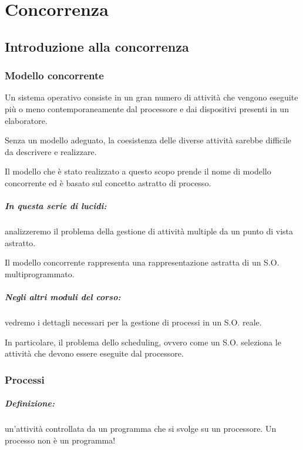 \chapter{Concorrenza}
\newpage

\section{Introduzione alla concorrenza}
\subsection{Modello concorrente}
Un sistema operativo consiste in un gran numero di attività che vengono eseguite più o meno contemporaneamente dal processore e dai
dispositivi presenti in un elaboratore.

Senza un modello adeguato, la coesistenza delle diverse attività sarebbe difficile da descrivere e realizzare.

Il modello che è stato realizzato a questo scopo prende il nome di
modello concorrente ed è basato sul concetto astratto di processo.

\paragraph{In questa serie di lucidi:} analizzeremo il problema della gestione di attività multiple da un punto di vista astratto.

Il modello concorrente rappresenta una rappresentazione astratta di
un S.O. multiprogrammato.

\paragraph{Negli altri moduli del corso:} vedremo i dettagli necessari per la gestione di processi in un S.O. reale.

In particolare, il problema dello scheduling, ovvero come un S.O.
seleziona le attività che devono essere eseguite dal processore.


\subsection{Processi}

\paragraph{Definizione:}un'attività controllata da un programma che si svolge su un processore. Un processo non è un programma!

